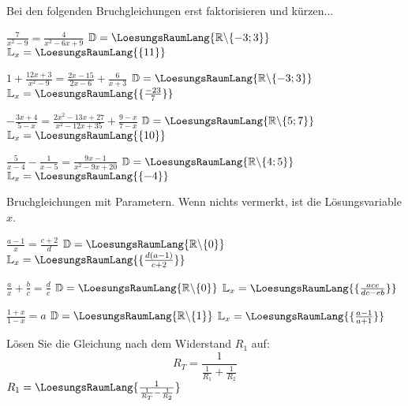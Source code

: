 \platzFuerBerechnungenBisEndeSeite{}

Bei den folgenden Bruchgleichungen erst faktorisieren und kürzen...

\begin{bbwAufgabenBlock}
\item $\frac7{x^2-9} = \frac4{x^2-6x+9}$ \hspace{10mm}    $\mathbb{D}= \LoesungsRaumLang{\mathbb{R}\backslash\{-3; 3\}}$ $\mathbb{L}_x = \LoesungsRaumLang{\{11\}}$
\item $1 + \frac{12x+3}{x^2-9} = \frac{2x-15}{2x-6} + \frac{6}{x+3}$ \hspace{10mm}    $\mathbb{D}= \LoesungsRaumLang{\mathbb{R}\backslash\{-3; 3\}}$ $\mathbb{L}_x = \LoesungsRaumLang{\{\frac{-23}{7}\}}$
\item $- \frac{3x+4}{5-x} = \frac{2x^2-13x+27}{x^2-12x+35} + \frac{9-x}{7-x}$ \hspace{10mm}    $\mathbb{D}= \LoesungsRaumLang{\mathbb{R}\backslash\{5;7\}}$ $\mathbb{L}_x = \LoesungsRaumLang{\{10\}}$
\item $\frac5{x-4} - \frac1{x-5} = \frac{9x-1}{x^2-9x+20}$ \hspace{10mm}    $\mathbb{D}= \LoesungsRaumLang{\mathbb{R}\backslash\{4;5\}}$ $\mathbb{L}_x = \LoesungsRaumLang{\{-4\}}$
\end{bbwAufgabenBlock}



\platzFuerBerechnungenBisEndeSeite{}







Bruchgleichungen mit Parametern. Wenn nichts vermerkt, ist die
Lösungsvariable $x$.

\begin{bbwAufgabenBlock}
\item $\frac{a-1}x = \frac{c+2}d$ \hspace{10mm}    $\mathbb{D}= \LoesungsRaumLang{\mathbb{R}\backslash\{0\}}$ $\mathbb{L}_x = \LoesungsRaumLang{\{\frac{d(a-1)}{c+2}\}}$
\item $\frac{a}x + \frac{b}c = \frac{d}e$ \hspace{10mm}    $\mathbb{D}= \LoesungsRaumLang{\mathbb{R}\backslash\{0\}}$ $\mathbb{L}_x = \LoesungsRaumLang{\{\frac{ace}{dc-eb}\}}$
\item $\frac{1+x}{1-x} = a$ \hspace{10mm}    $\mathbb{D}= \LoesungsRaumLang{\mathbb{R}\backslash\{1\}}$ $\mathbb{L}_x = \LoesungsRaumLang{\{\frac{a-1}{a+1}\}}$
\item Lösen Sie die Gleichung nach dem Widerstand $R_1$ auf:
      $$R_T = \frac1{\frac1{R_1} + \frac1{R_2}}$$    $R_1 = \LoesungsRaumLang{\frac1{\frac1{R_T}-\frac1{R_2}}}$
\end{bbwAufgabenBlock}



